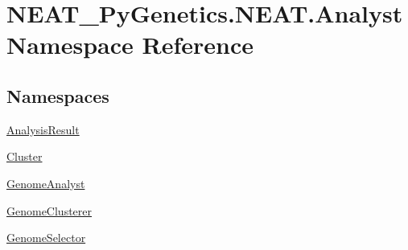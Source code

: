 \hypertarget{namespaceNEAT__PyGenetics_1_1NEAT_1_1Analyst}{}\section{N\+E\+A\+T\+\_\+\+Py\+Genetics.\+N\+E\+A\+T.\+Analyst Namespace Reference}
\label{namespaceNEAT__PyGenetics_1_1NEAT_1_1Analyst}
\subsection*{Namespaces}
\begin{DoxyCompactItemize}
\item 
 \hyperlink{namespaceNEAT__PyGenetics_1_1NEAT_1_1Analyst_1_1AnalysisResult}{Analysis\+Result}
\item 
 \hyperlink{namespaceNEAT__PyGenetics_1_1NEAT_1_1Analyst_1_1Cluster}{Cluster}
\item 
 \hyperlink{namespaceNEAT__PyGenetics_1_1NEAT_1_1Analyst_1_1GenomeAnalyst}{Genome\+Analyst}
\item 
 \hyperlink{namespaceNEAT__PyGenetics_1_1NEAT_1_1Analyst_1_1GenomeClusterer}{Genome\+Clusterer}
\item 
 \hyperlink{namespaceNEAT__PyGenetics_1_1NEAT_1_1Analyst_1_1GenomeSelector}{Genome\+Selector}
\end{DoxyCompactItemize}
